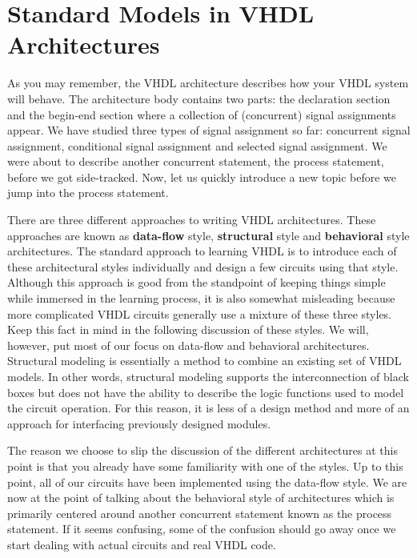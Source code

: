 %
%
\chapter{Standard Models in VHDL Architectures}
As you may remember, the VHDL architecture describes how your VHDL system will behave. The architecture body contains two parts: the declaration section and the begin-end section where a collection of (concurrent) signal assignments appear. We have studied three types of signal assignment so far: concurrent signal assignment, conditional signal assignment and selected signal assignment. We were about to describe another concurrent statement, the process statement, before we got side-tracked. Now, let us quickly introduce a new topic before we jump into the process statement.

There are three different approaches to writing VHDL architectures. These approaches are known as \textbf{data-flow} style, \textbf{structural} style and \textbf{behavioral} style architectures. The standard approach to learning VHDL is to introduce each of these architectural styles individually and design a few circuits using that style. Although this approach is good from the standpoint of keeping things simple while immersed in the learning process, it is also somewhat misleading because more complicated VHDL circuits generally use a mixture of these three styles. Keep this fact in mind in the following discussion of these styles. We will, however, put most of our focus on data-flow and behavioral architectures. Structural modeling is essentially a method to combine an existing set of VHDL models. In other words, structural modeling supports the interconnection of black boxes but does not have the ability to describe the logic functions used to model the circuit operation. For this reason, it is less of a design method and more of an approach for interfacing previously designed modules.

The reason we choose to slip the discussion of the different architectures at this point is that you already have some familiarity with one of the styles. Up to this point, all of our circuits have been implemented using the data-flow style. We are now at the point of talking about the behavioral style of architectures which is primarily centered around another concurrent statement known as the process statement. If it seems confusing, some of the confusion should go away once we start dealing with actual circuits and real VHDL code.

